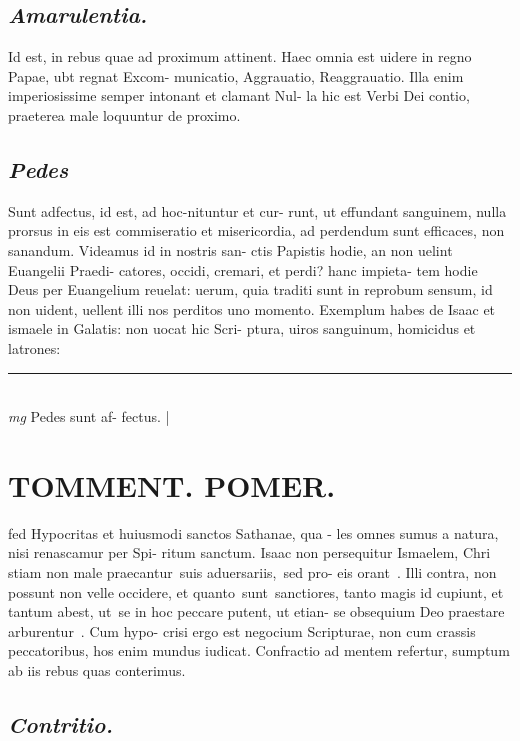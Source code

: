 \documentclass{article}
\begin{document}
\begin{pages}
\subsection*{\textit{Amarulentia. }}\pstart Id est, in rebus quae ad proximum attinent. Haec omnia est uidere in regno Papae, ubt regnat Excom- municatio, Aggrauatio, Reaggrauatio. Illa enim imperiosissime semper intonant et clamant Nul- la hic est Verbi Dei contio, praeterea male loquuntur de proximo.  \pend
{}
{}
\subsection*{\textit{Pedes }}\pstart Sunt adfectus, id est, ad hoc-nituntur et cur- runt, ut effundant sanguinem, nulla prorsus in eis est commiseratio et misericordia, ad perdendum sunt efficaces, non sanandum. Videamus id in nostris san- ctis Papistis hodie, an non uelint Euangelii Praedi- catores, occidi, cremari, et perdi? hanc impieta- tem hodie Deus per Euangelium reuelat: uerum, quia traditi sunt in reprobum sensum, id non uident, uellent illi nos perditos uno momento. Exemplum habes de Isaac et ismaele in Galatis: non uocat hic Scri- ptura, uiros sanguinum, homicidus et latrones:  \pend\pstart  \pend
\vspace{0.5cm}\noindent
\vspace{0.2cm}\rule{1cm}{0.2pt}\\ 
\hspace{0.2cm}\textit{mg}
\footnotesize Pedes sunt af- fectus.  
\normalsize| 
\section*{TOMMENT. POMER.  }\pstart fed Hypocritas et huiusmodi sanctos Sathanae, qua - les omnes sumus a natura, nisi renascamur per Spi- ritum sanctum. Isaac non persequitur Ismaelem, Chri stiam non male praecantur suis aduersariis, sed pro- eis orant . Illi contra, non possunt non velle occidere, et quanto sunt sanctiores, tanto magis id cupiunt, et tantum abest, ut se in hoc peccare putent, ut etian- se obsequium Deo praestare arburentur . Cum hypo- crisi ergo est negocium Scripturae, non cum crassis peccatoribus, hos enim mundus iudicat.   \pend\pstart Confractio ad mentem refertur, sumptum ab iis rebus quas conterimus.   \pend
{}
{}
\subsection*{\textit{Contritio. }}
{}

\end{pages}
\end{document}
